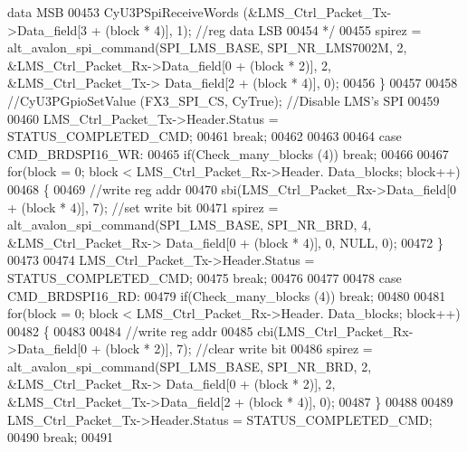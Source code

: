 \begin{DoxyCode}
{       data MSB}
00453 \textcolor{comment}{                        CyU3PSpiReceiveWords (&LMS\_Ctrl\_Packet\_Tx->Data\_field[3 + (block * 4)], 1); //reg
       data LSB}
00454 \textcolor{comment}{                        */}
00455                         spirez = alt_avalon_spi_command(SPI_LMS_BASE, 
      SPI_NR_LMS7002M, 2, &LMS\_Ctrl\_Packet\_Rx->Data_field[0 + (block * 2)], 2, &LMS\_Ctrl\_Packet\_Tx->
      Data_field[2 + (block * 4)], 0);
00456                     \}
00457 
00458                     \textcolor{comment}{//CyU3PGpioSetValue (FX3\_SPI\_CS, CyTrue); //Disable LMS's SPI}
00459 
00460                     LMS\_Ctrl\_Packet\_Tx->Header.Status = STATUS_COMPLETED_CMD;
00461                 \textcolor{keywordflow}{break};
00462 
00463 
00464                 \textcolor{keywordflow}{case} CMD_BRDSPI16_WR:
00465                     \textcolor{keywordflow}{if}(Check_many_blocks (4)) \textcolor{keywordflow}{break};
00466 
00467                     \textcolor{keywordflow}{for}(block = 0; block < LMS\_Ctrl\_Packet\_Rx->Header.
      Data_blocks; block++)
00468                     \{
00469                         \textcolor{comment}{//write reg addr}
00470                         sbi(LMS\_Ctrl\_Packet\_Rx->Data_field[0 + (block * 4)], 7); \textcolor{comment}{//set write bit}
00471                         spirez = alt_avalon_spi_command(SPI_LMS_BASE, SPI_NR_BRD, 4, &LMS\_Ctrl\_Packet\_Rx->
      Data_field[0 + (block * 4)], 0, NULL, 0);
00472                     \}
00473 
00474                     LMS\_Ctrl\_Packet\_Tx->Header.Status = STATUS_COMPLETED_CMD;
00475                 \textcolor{keywordflow}{break};
00476 
00477 
00478                 \textcolor{keywordflow}{case} CMD_BRDSPI16_RD:
00479                     \textcolor{keywordflow}{if}(Check_many_blocks (4)) \textcolor{keywordflow}{break};
00480 
00481                     \textcolor{keywordflow}{for}(block = 0; block < LMS\_Ctrl\_Packet\_Rx->Header.
      Data_blocks; block++)
00482                     \{
00483 
00484                         \textcolor{comment}{//write reg addr}
00485                         cbi(LMS\_Ctrl\_Packet\_Rx->Data_field[0 + (block * 2)], 7);  \textcolor{comment}{//clear write bit}
00486                         spirez = alt_avalon_spi_command(SPI_LMS_BASE, SPI_NR_BRD, 2, &LMS\_Ctrl\_Packet\_Rx->
      Data_field[0 + (block * 2)], 2, &LMS\_Ctrl\_Packet\_Tx->Data_field[2 + (block * 4)], 0);
00487                     \}
00488 
00489                     LMS\_Ctrl\_Packet\_Tx->Header.Status = STATUS_COMPLETED_CMD;
00490                 \textcolor{keywordflow}{break};
00491 

\end{DoxyCode}
